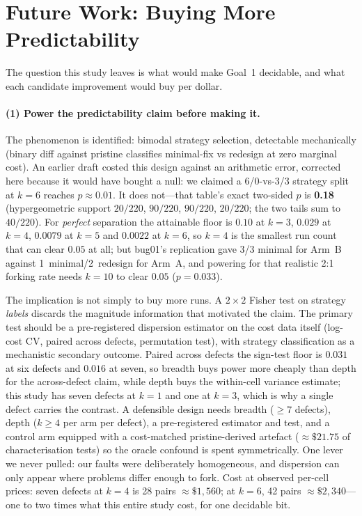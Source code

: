 \documentclass[runningheads]{llncs}
\begin{document}
\section{Future Work: Buying More Predictability}\label{sec:future}

The question this study leaves is what would make Goal~1 decidable, and what
each candidate improvement would buy per dollar.

\paragraph{(1) Power the predictability claim before making it.} The
phenomenon is identified: bimodal strategy selection, detectable mechanically
(binary diff against pristine classifies minimal-fix vs redesign at zero
marginal cost). An earlier draft costed this design against an arithmetic
error, corrected here because it would have bought a null: we claimed a
6/0-vs-3/3 strategy split at $k=6$ reaches $p\approx0.01$. It does not---that
table's exact two-sided $p$ is \textbf{0.18} (hypergeometric support $20/220$,
$90/220$, $90/220$, $20/220$; the two tails sum to $40/220$). For \emph{perfect}
separation the attainable floor is $0.10$ at $k=3$, $0.029$ at $k=4$, $0.0079$
at $k=5$ and $0.0022$ at $k=6$, so $k=4$ is the smallest run count that can
clear $0.05$ at all; but bug01's replication gave 3/3 minimal for Arm~B against
1~minimal/2~redesign for Arm~A, and powering for that realistic 2:1 forking rate
needs $k=10$ to clear $0.05$ ($p=0.033$).

The implication is not simply to buy more runs. A $2\times2$ Fisher test on
strategy \emph{labels} discards the magnitude information that motivated the
claim. The primary test should be a pre-registered dispersion estimator on the
cost data itself (log-cost CV, paired across defects, permutation test), with
strategy classification as a mechanistic secondary outcome. Paired across
defects the sign-test floor is $0.031$ at six defects and $0.016$ at seven, so
breadth buys power more cheaply than depth for the across-defect claim, while
depth buys the within-cell variance estimate; this study has seven defects at
$k=1$ and one at $k=3$, which is why a single defect carries the contrast. A
defensible design needs breadth ($\geq7$ defects), depth ($k\geq4$ per arm per
defect), a pre-registered estimator and test, and a control arm equipped with a
cost-matched pristine-derived artefact ($\approx\$21.75$ of characterisation
tests) so the oracle confound is spent symmetrically. One lever we never pulled:
our faults were deliberately homogeneous, and dispersion can only appear where
problems differ enough to fork. Cost at observed per-cell prices: seven defects
at $k=4$ is 28 pairs $\approx\$1{,}560$; at $k=6$, 42 pairs
$\approx\$2{,}340$---one to two times what this entire study cost, for one
decidable bit.
\end{document}
